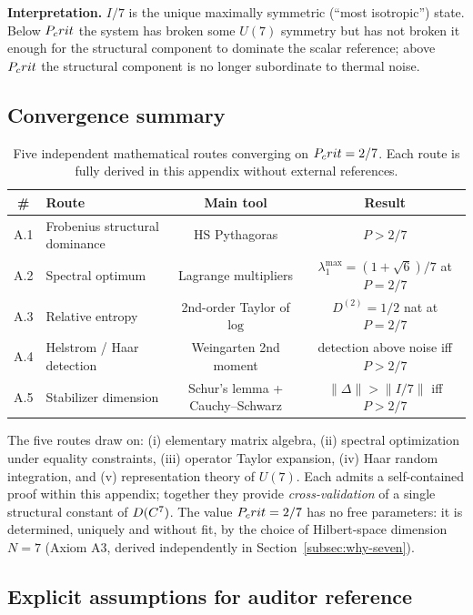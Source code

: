 \textbf{Interpretation.} $I/7$ is the unique maximally symmetric (``most
isotropic'') state. Below $P_crit$ the system has broken some $U(7)$ symmetry
but has not broken it enough for the structural component
to dominate the scalar reference; above $P_crit$ the structural
component is no longer subordinate to thermal noise.

\subsection{Convergence summary}

\begin{table}[H]
\centering
\caption{Five independent mathematical routes converging on $P_crit = 2/7$.
Each route is fully derived in this appendix without external references.}
\label{tab:pcrit-derivations}
\begin{tabular}{@{}clcc@{}}
\toprule
\textbf{\#} & \textbf{Route} & \textbf{Main tool} & \textbf{Result}\\
\midrule
A.1 & Frobenius structural dominance & HS Pythagoras   & $P > 2/7$\\
A.2 & Spectral optimum               & Lagrange multipliers   & $\lambda_1^{\max} = (1+\sqrt 6)/7$ at $P = 2/7$\\
A.3 & Relative entropy               & 2nd-order Taylor of $\log$ & $D^{(2)} = 1/2$ nat at $P = 2/7$\\
A.4 & Helstrom / Haar detection      & Weingarten 2nd moment   & detection above noise iff $P > 2/7$\\
A.5 & Stabilizer dimension           & Schur's lemma + Cauchy--Schwarz & $\|\Delta\| > \|I/7\|$ iff $P > 2/7$\\
\bottomrule
\end{tabular}
\end{table}

The five routes draw on: (i) elementary matrix algebra, (ii) spectral
optimization under equality constraints, (iii) operator Taylor expansion,
(iv) Haar random integration, and (v) representation theory of
$U(7)$. Each admits a self-contained proof within this appendix; together
they provide \emph{cross-validation} of a single structural constant of
$D(C^7)$. The value $P_crit = 2/7$ has no free parameters:
it is determined, uniquely and without fit, by the choice of Hilbert-space
dimension $N = 7$ (Axiom A3, derived independently in
Section~\ref{subsec:why-seven}).

\subsection{Explicit assumptions for auditor reference}
\label{app:pcrit-assumptions}

